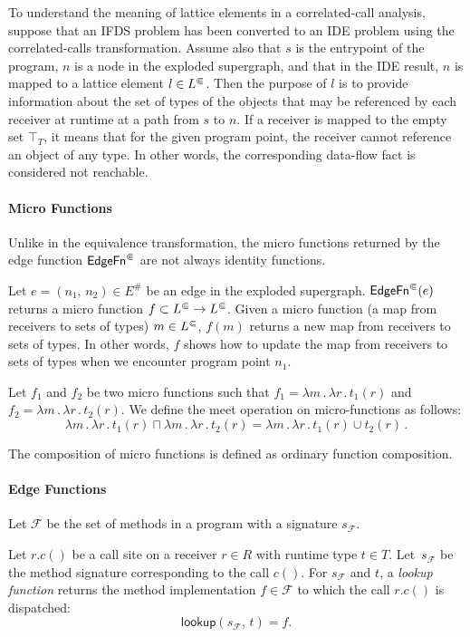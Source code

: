 To understand the meaning of lattice elements in a correlated-call analysis, suppose that an IFDS problem has been converted to an IDE problem using the correlated-calls transformation. 
Assume also that $s$ is the entrypoint of the program, $n$ is a node in the exploded supergraph, and that in the IDE result, $n$ is mapped to a lattice element $l\in L^\Subset$. 
Then the purpose of $l$ is to provide information about the set of types of the objects that may be referenced by each receiver at runtime at a path from $s$ to $n$. 
If a receiver is mapped to the empty set $\top_T$, it means that for the given program point, the receiver cannot reference an object of any type.
In other words, the corresponding data-flow fact is considered not reachable.

\paragraph{Micro Functions}\label{sec:micro}
Unlike in the equivalence transformation, the micro functions returned by the edge function $\textsf{EdgeFn}^\Subset$ are not always identity functions.

Let $e=(n_1,\,n_2)\in E^\#$ be an edge in the exploded supergraph.
$\textsf{EdgeFn}^\Subset(e)$ returns a micro function $f\subset L^\Subset\to L^\Subset$.
Given a micro function (a map from receivers to sets of types) $m\in L^\Subset$, $f(m)$ returns a new map from receivers to sets of types.
In other words, $f$ shows how to update the map from receivers to sets of types when we encounter program point $n_1$.

Let $f_1$ and $f_2$ be two micro functions such that ${f_1=\lambda m\,.\,\lambda r\,.\,t_1(r)}$ and ${f_2={\lambda m\,.\,\lambda r\,.\,t_2(r)}}$. We define the meet operation on micro-functions as follows:
\begin{equation}\label{eq:micromeet}
  \lambda m\,.\,\lambda r\,.\,t_1(r)\sqcap\lambda m\,.\,\lambda r\,.\,t_2(r)
  =\lambda m\,.\,\lambda r\,.\,t_1(r)\cup t_2(r)\,.
\end{equation}

The composition of micro functions is defined as ordinary function composition.

\paragraph{Edge Functions}\label{sec:ef}

Let $\mathcal F$ be the set of methods in a program with a signature $s_\mathcal F$.
\begin{definition}
  Let $r.c()$ be a call site on a receiver $r\in R$ with runtime type $t\in T$.
  Let~$s_\mathcal F$ be the method signature corresponding to the call $c()$.
  For $s_\mathcal F$ and $t$, a \textit{lookup function} returns the method implementation $f\in\mathcal F$ to which the call $r.c()$ is dispatched:
  \begin{equation}
    \textsf{lookup}(s_\mathcal F,\,t)=f.
  \end{equation}
\end{definition}

